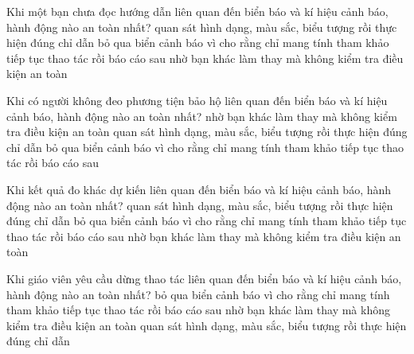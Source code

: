 \begin{ex}
Khi một bạn chưa đọc hướng dẫn liên quan đến biển báo và kí hiệu cảnh báo, hành động nào an toàn nhất?
\choice
{\True quan sát hình dạng, màu sắc, biểu tượng rồi thực hiện đúng chỉ dẫn}
{bỏ qua biển cảnh báo vì cho rằng chỉ mang tính tham khảo}
{tiếp tục thao tác rồi báo cáo sau}
{nhờ bạn khác làm thay mà không kiểm tra điều kiện an toàn}
\end{ex}

\begin{ex}
Khi có người không đeo phương tiện bảo hộ liên quan đến biển báo và kí hiệu cảnh báo, hành động nào an toàn nhất?
\choice
{nhờ bạn khác làm thay mà không kiểm tra điều kiện an toàn}
{\True quan sát hình dạng, màu sắc, biểu tượng rồi thực hiện đúng chỉ dẫn}
{bỏ qua biển cảnh báo vì cho rằng chỉ mang tính tham khảo}
{tiếp tục thao tác rồi báo cáo sau}
\end{ex}

\begin{ex}
Khi kết quả đo khác dự kiến liên quan đến biển báo và kí hiệu cảnh báo, hành động nào an toàn nhất?
\choice
{\True quan sát hình dạng, màu sắc, biểu tượng rồi thực hiện đúng chỉ dẫn}
{bỏ qua biển cảnh báo vì cho rằng chỉ mang tính tham khảo}
{tiếp tục thao tác rồi báo cáo sau}
{nhờ bạn khác làm thay mà không kiểm tra điều kiện an toàn}
\end{ex}

\begin{ex}
Khi giáo viên yêu cầu dừng thao tác liên quan đến biển báo và kí hiệu cảnh báo, hành động nào an toàn nhất?
\choice
{bỏ qua biển cảnh báo vì cho rằng chỉ mang tính tham khảo}
{tiếp tục thao tác rồi báo cáo sau}
{nhờ bạn khác làm thay mà không kiểm tra điều kiện an toàn}
{\True quan sát hình dạng, màu sắc, biểu tượng rồi thực hiện đúng chỉ dẫn}
\end{ex}

